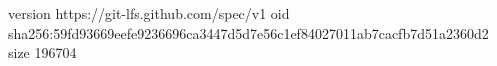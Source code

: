 version https://git-lfs.github.com/spec/v1
oid sha256:59fd93669eefe9236696ca3447d5d7e56c1ef84027011ab7cacfb7d51a2360d2
size 196704
